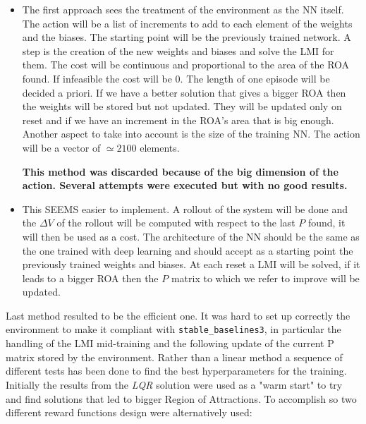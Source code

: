 \documentclass{article}
\begin{document}
\begin{itemize}
  \item The first approach sees the treatment of the environment as the NN itself. The action will be a list of increments to add to each element of the weights and the biases. The starting point will be the previously trained network. A step is the creation of the new weights and biases and solve the LMI for them. The cost will be continuous and proportional to the area of the ROA found. If infeasible the cost will be $0$. The length of one episode will be decided a priori. If we have a better solution that gives a bigger ROA then the weights will be stored but not updated. They will be updated only on reset and if we have an increment in the ROA's area that is big enough. Another aspect to take into account is the size of the training NN. The action will be a vector of $\simeq 2100$ elements.

  \textbf{This method was discarded because of the big dimension of the action. Several attempts were executed but with no good results.}

  \item This SEEMS easier to implement. A rollout of the system will be done and the $\Delta V$ of the rollout will be computed with respect to the last $P$ found, it will then be used as a cost. The architecture of the NN should be the same as the one trained with deep learning and should accept as a starting point the previously trained weights and biases. At each reset a LMI will be solved, if it leads to a bigger ROA then the $P$ matrix to which we refer to improve will be updated.
\end{itemize}

Last method resulted to be the efficient one. It was hard to set up correctly the environment to make it compliant with \texttt{stable\_baselines3}, in particular the handling of the LMI mid-training and the following update of the current P matrix stored by the environment. 
Rather than a linear method a sequence of different tests has been done to find the best hyperparameters for the training. Initially the results from the \textit{LQR} solution were used as a "warm start" to try and find solutions that led to bigger Region of Attractions. To accomplish so two different reward functions design were alternatively used:
\end{document}
